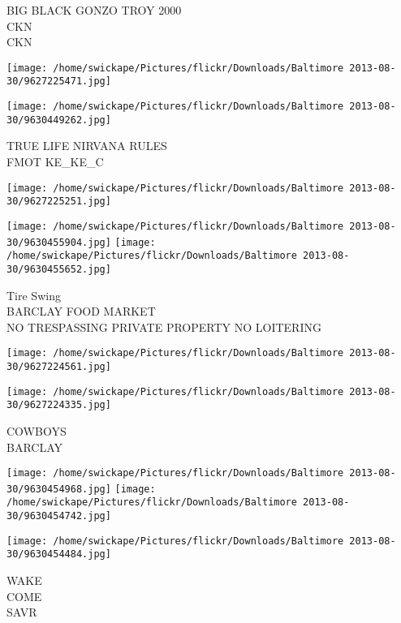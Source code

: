 \documentclass[10pt,letterpaper]{article}
\begin{document}
BIG BLACK GONZO TROY 2000\\
CKN\\
CKN\\
\pagebreak

\texttt{[image: /home/swickape/Pictures/flickr/Downloads/Baltimore 2013-08-30/9627225471.jpg]}

\vspace{0.25in}
\texttt{[image: /home/swickape/Pictures/flickr/Downloads/Baltimore 2013-08-30/9630449262.jpg]}

TRUE LIFE NIRVANA RULES\\
FMOT KE\_KE\_C\\
\pagebreak

\texttt{[image: /home/swickape/Pictures/flickr/Downloads/Baltimore 2013-08-30/9627225251.jpg]}

\vspace{0.25in}
\texttt{[image: /home/swickape/Pictures/flickr/Downloads/Baltimore 2013-08-30/9630455904.jpg]}
\texttt{[image: /home/swickape/Pictures/flickr/Downloads/Baltimore 2013-08-30/9630455652.jpg]}

Tire Swing\\
BARCLAY FOOD MARKET\\
NO TRESPASSING PRIVATE PROPERTY NO LOITERING\\
\pagebreak

\texttt{[image: /home/swickape/Pictures/flickr/Downloads/Baltimore 2013-08-30/9627224561.jpg]}

\vspace{0.25in}
\texttt{[image: /home/swickape/Pictures/flickr/Downloads/Baltimore 2013-08-30/9627224335.jpg]}

COWBOYS\\
BARCLAY\\
\pagebreak

\texttt{[image: /home/swickape/Pictures/flickr/Downloads/Baltimore 2013-08-30/9630454968.jpg]}
\texttt{[image: /home/swickape/Pictures/flickr/Downloads/Baltimore 2013-08-30/9630454742.jpg]}

\texttt{[image: /home/swickape/Pictures/flickr/Downloads/Baltimore 2013-08-30/9630454484.jpg]}

WAKE\\
COME\\
SAVR\\
\pagebreak
\end{document}

